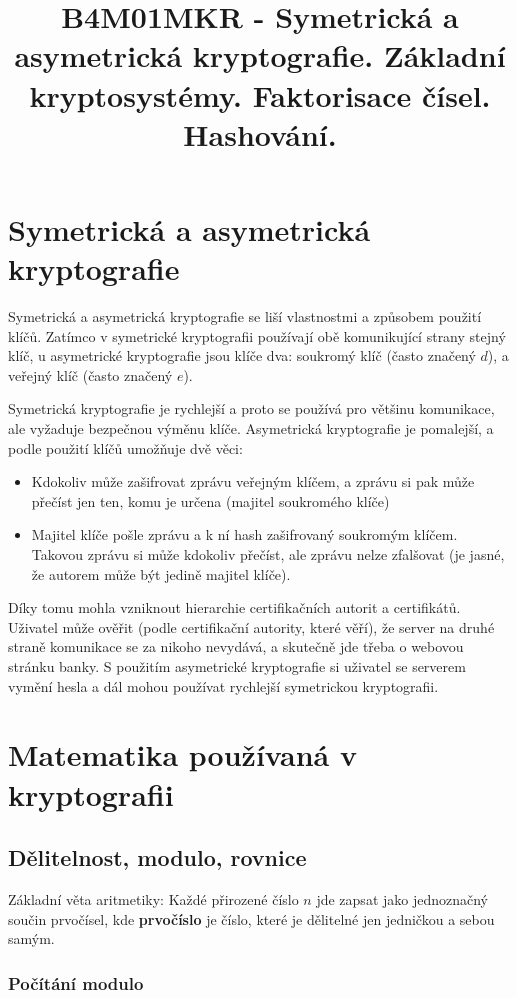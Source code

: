\documentclass[10pt,a4paper]{article}
\title{B4M01MKR - Symetrická a asymetrická kryptografie. Základní kryptosystémy. Faktorisace čísel. Hashování.}
\date{}
\begin{document}
\maketitle
\section{Symetrická a asymetrická kryptografie}
Symetrická a asymetrická kryptografie se liší vlastnostmi a způsobem použití klíčů. Zatímco v symetrické kryptografii používají obě komunikující strany stejný klíč, u asymetrické kryptografie jsou klíče dva: soukromý klíč (často značený $d$), a veřejný klíč (často značený $e$).

Symetrická kryptografie je rychlejší a proto se používá pro většinu komunikace, ale vyžaduje bezpečnou výměnu klíče. Asymetrická kryptografie je pomalejší, a podle použití klíčů umožňuje dvě věci:
\begin{itemize}
\item Kdokoliv může zašifrovat zprávu veřejným klíčem, a zprávu si pak může přečíst jen ten, komu je určena (majitel soukromého klíče)
\item Majitel klíče pošle zprávu a k ní hash zašifrovaný soukromým klíčem. Takovou zprávu si může kdokoliv přečíst, ale zprávu nelze zfalšovat (je jasné, že autorem může být jedině majitel klíče).
\end{itemize}

Díky tomu mohla vzniknout hierarchie certifikačních autorit a certifikátů. Uživatel může ověřit (podle certifikační autority, které věří), že server na druhé straně komunikace se za nikoho nevydává, a skutečně jde třeba o webovou stránku banky. S použitím asymetrické kryptografie si uživatel se serverem vymění hesla a dál mohou používat rychlejší symetrickou kryptografii.

\section{Matematika používaná v kryptografii}
\subsection{Dělitelnost, modulo, rovnice}

Základní věta aritmetiky: Každé přirozené číslo $n$ jde zapsat jako jednoznačný součin prvočísel, kde \textbf{prvočíslo} je číslo, které je dělitelné jen jedničkou a sebou samým.

\subsubsection{Počítání modulo}
\end{document}

